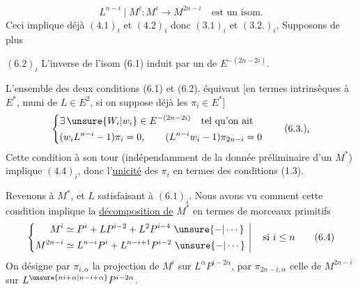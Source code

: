 
\[
 L^{n-i}\mid M^i : M^i\longrightarrow M^{2n-i}\quad\text{est un isom.}
 \tag*{$(6.1)_i$}
\]
Ceci implique déjà $(4.1)_i$ et $(4.2)_i$ donc $(3.1)_i$ et $(3.2.)_i$,  Supposons de plus

$(6.2)_i$ L'inverse de l'isom (6.1)   induit par un  de $E^{-(2n-2i)}$.

 L'ensemble des deux conditions (6.1) et (6.2). équivaut [en termes intrinsèques à $E^*$, muni de  $L\in E^2$, si on suppose déjà les $\pi_i\in E^*$]
\[
 \left\{\begin{aligned}
 &\exists\,\unsure{W_i|w_i}\in E^{-(2n-2i)}\quad\text{tel qu'on ait}\\
 &(w_i L^{n-i}-1)\pi_i=0,\qquad (L^{n-i}w_i-1)\pi_{2n-i}=0
 \end{aligned}\right.
 \tag*{$(6.3.)_i$}
\]
Cette condition à son tour (indépendamment de la donnée préliminaire d'un $M^*$) implique $(4.4)_i$,  donc   l'\uline{unicité} des $\pi_i$ en termes des conditions  (1.3).

Revenons à $M^*$, et $L$ satisfaisant à $(6.1)_i$. Nous avons vu comment  cette condition implique la \uline{décomposition de} $M^*$ en termes  de morceaux primitifs
\[
 \left\{\begin{aligned}
 M^i&\simeq P^i+LP^{i-2}+L^2P^{i-4}\ \unsure{-|\cdots}\\
 M^{2n-i}&\simeq L^{n-i}P^i+L^{n-i+1}P^{i-2}\ \unsure{-|\cdots}
 \end{aligned}\ \right|\quad\text{si }i\le n
 \tag*{(6.4)}
\]
On désigne par $\pi_{i,\alpha}$ la projection de $M^i$ sur $L^\alpha P^{i-2\alpha}$, par $\pi_{2n-i,\alpha}$ celle de $M^{2n-i}$ sur $L^{\unsure{ni+\alpha|n-i+\alpha}}P^{i-2\alpha}$.
